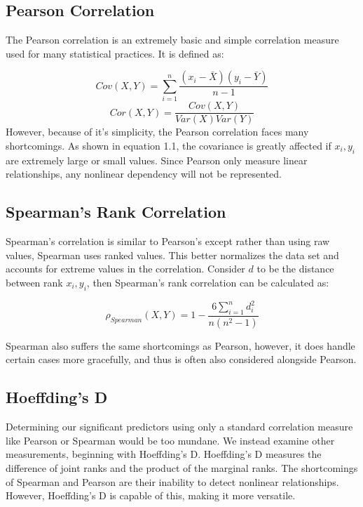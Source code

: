 \documentclass[10pt]{siamltex}
\begin{document}
\subsection{Pearson Correlation}

The Pearson correlation is an extremely basic and simple correlation measure used for many statistical practices. It is defined as:

\begin{equation}
Cov(X,Y) = \sum_{i=1}^n\frac{(x_i - \bar{X})(y_i - \bar{Y})}{n-1}
\end{equation}
\begin{equation}
Cor(X,Y) = \frac{Cov(X,Y)}{Var(X)Var(Y)}
\end{equation}
 However, because of it's simplicity, the Pearson correlation faces many shortcomings. As shown in equation 1.1, the covariance is greatly affected if $x_i, y_i$ are extremely large or small values. Since Pearson only measure linear relationships, any nonlinear dependency will not be represented\cite{CorComp}. 

\subsection{Spearman's Rank Correlation}

Spearman's correlation is similar to Pearson's except rather than using raw values, Spearman uses ranked values. This better normalizes the data set and accounts for extreme values in the correlation. Consider $d$ to be the distance between rank $x_i, y_i$, then Spearman's rank correlation can be calculated as\cite{CompGeneExpress}:

\begin{equation}
\rho_{Spearman}(X,Y) = 1 - \frac{6\sum_{i=1}^nd_i^2}{n(n^2 - 1)}
\end{equation}

Spearman also suffers the same shortcomings as Pearson, however, it does handle certain cases more gracefully, and thus is often also considered alongside Pearson.

\subsection{Hoeffding's D}

Determining our significant predictors using only a standard correlation measure like Pearson or Spearman would be too mundane. We instead examine other measurements, beginning with Hoeffding's D.
Hoeffding's D measures the difference of joint ranks and the product of the marginal ranks. The shortcomings of Spearman and Pearson are their inability to detect nonlinear relationships. However, Hoeffding's D is capable of this, making it more versatile\cite{CorComp}.
\end{document}
